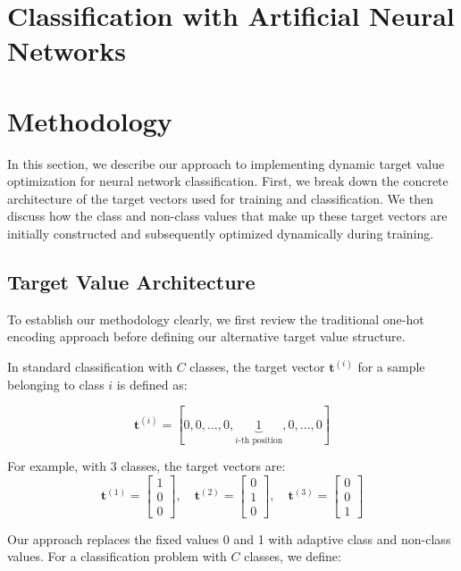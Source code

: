 \documentclass[12pt,fleqn,a4paper]{article}
\begin{document}
\section{Classification with Artificial Neural Networks} %

\section{Methodology}
In this section, we describe our approach to implementing dynamic target value optimization for neural network classification. First, we break down the concrete architecture of the target vectors used for training and classification. We then discuss how the class and non-class values that make up these target vectors are initially constructed and subsequently optimized dynamically during training.

\subsection{Target Value Architecture}

To establish our methodology clearly, we first review the traditional one-hot encoding approach before defining our alternative target value structure.


In standard classification with $C$ classes, the target vector $\mathbf{t}^{(i)}$ for a sample belonging to class $i$ is defined as:

$$\mathbf{t}^{(i)} = [0, 0, \ldots, 0, \underbrace{1}_{i\text{-th position}}, 0, \ldots, 0]$$

For example, with 3 classes, the target vectors are:
$$\mathbf{t}^{(1)} = \begin{bmatrix} 1 \\ 0 \\ 0 \end{bmatrix}, \quad 
\mathbf{t}^{(2)} = \begin{bmatrix} 0 \\ 1 \\ 0 \end{bmatrix}, \quad 
\mathbf{t}^{(3)} = \begin{bmatrix} 0 \\ 0 \\ 1 \end{bmatrix}$$


Our approach replaces the fixed values 0 and 1 with adaptive class and non-class values. For a classification problem with $C$ classes, we define:
\end{document}
